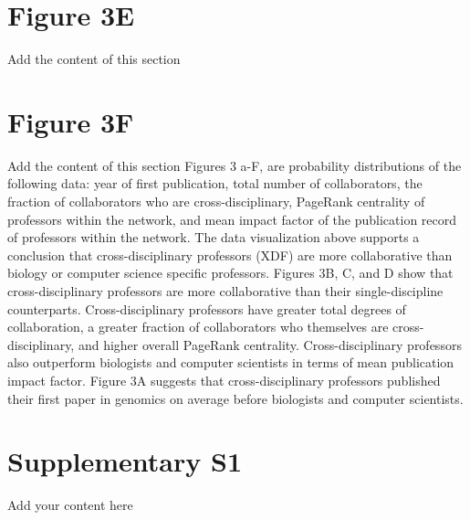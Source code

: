 \documentclass[10pt]{article}         %
\begin{document}
\newpage
\section{Figure 3E}
Add the content of this section

\newpage
\section{Figure 3F}
Add the content of this section
Figures 3 a-F, are probability distributions of the following data: year of first publication, total number of collaborators, the fraction of collaborators who are cross-disciplinary, PageRank centrality of professors within the network, and mean impact factor of the publication record of professors within the network. The data visualization above supports a conclusion that cross-disciplinary professors (XDF) are more collaborative than biology or computer science specific professors. Figures 3B, C, and D show that cross-disciplinary professors are more collaborative than their single-discipline counterparts. Cross-disciplinary professors have greater total degrees of collaboration, a greater fraction of collaborators who themselves are cross-disciplinary, and higher overall PageRank centrality. Cross-disciplinary professors also outperform biologists and computer scientists in terms of mean publication impact factor. Figure 3A suggests that cross-disciplinary professors published their first paper in genomics on average before biologists and computer scientists. 

\newpage
\section{Supplementary S1}
Add your content here\\

\newpage
\end{document}
